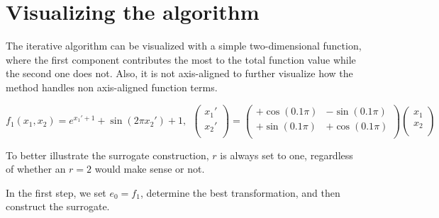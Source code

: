 \documentclass[
  a4paper,  %
  twoside,  %
  bibliography=totoc,
  headsepline,
  cleardoublepage=empty,
  parskip=half,
  draft=false
]{scrbook}
\begin{document}
\section{Visualizing the algorithm}

The iterative algorithm can be visualized with a simple two-dimensional function, where the first component contributes the most to the total function value while the second one does not.
Also, it is not axis-aligned to further visualize how the method handles non axis-aligned function terms.

\begin{equation}
f_1(x_1, x_2)=e^{x_1' + 1} + \sin(2 \pi x_2') + 1, ~~ \begin{pmatrix}
    x_1' \\ x_2'
    \\
  \end{pmatrix} = \begin{pmatrix}
    +\cos(0.1 \pi) & -\sin(0.1 \pi)\\
    +\sin(0.1 \pi) & +\cos(0.1 \pi)
    \\
  \end{pmatrix}\begin{pmatrix}
    x_1 \\ x_2
    \\
  \end{pmatrix}
\end{equation}

To better illustrate the surrogate construction, $r$ is always set to one, regardless of whether an $r=2$ would make sense or not.

In the first step, we set $e_0=f_1$, determine the best transformation, and then construct the surrogate.
\end{document}
